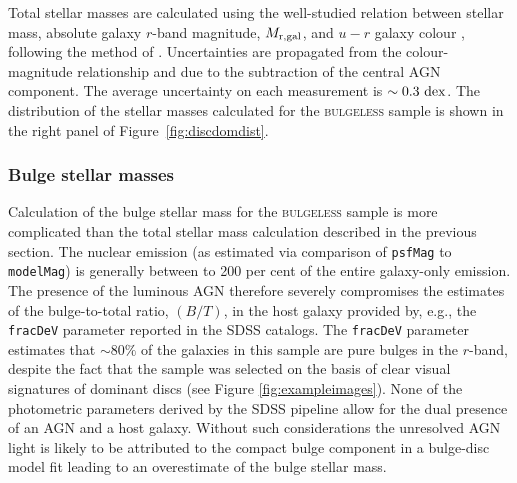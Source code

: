 {Total stellar masses are calculated using the well-studied relation between stellar mass, absolute galaxy $r$-band magnitude, $M_{\rm{r, gal}}$, and $u-r$ galaxy colour \citep[corrected for galactic extinction;][using the galaxy magnitudes described in Section~\ref{sec:photo}]{schlegel98}, following the method of \citet[][see Section \ref{intro}]{Baldry06}. Uncertainties are propagated from the colour-magnitude relationship and due to the subtraction of the central AGN component. The average uncertainty on each measurement is $\sim0.3~\rm{dex}$. The distribution of the stellar masses calculated for the \textsc{bulgeless} sample is shown in the right panel of Figure~\ref{fig:discdomdist}. 

\subsubsection{Bulge stellar masses}\label{sec:bulgemass}

Calculation of the bulge stellar mass for the \textsc{bulgeless} sample is more complicated than the total stellar mass calculation described in the previous section. The nuclear emission (as estimated via comparison of {\tt psfMag} to {\tt modelMag}) is generally between { to 200 per cent} of the entire galaxy-only emission. The presence of the luminous AGN therefore severely compromises the estimates of the bulge-to-total ratio, $(B/T)$, in the host galaxy provided by, e.g., the {\tt fracDeV} parameter reported in the SDSS catalogs. The {\tt fracDeV} parameter estimates that $\sim 80\%$ of the galaxies in this sample are pure \citet{devaucouleurs} bulges in the $r$-band, despite the fact that the sample was selected on the basis of clear visual signatures of dominant discs (see Figure \ref{fig:exampleimages}). None of the photometric parameters derived by the SDSS pipeline allow for the dual presence of an AGN and a host galaxy. Without such considerations the unresolved AGN light is likely to be attributed to the compact bulge component in a bulge-disc model fit \citep{simmons08,koss11} leading to an overestimate of the bulge stellar mass.


}
